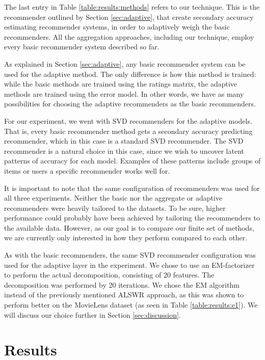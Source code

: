 The last entry in Table \ref{table:results:methods}
refers to our technique. 
This is the recommender outlined by Section \ref{sec:adaptive},
that create secondary accuracy estimating recommender systems,
in order to adaptively weigh the basic recommenders.
All the aggregation approaches, including our technique,
employ every basic recommender system described so far.

As explained in Section \ref{sec:adaptive},
any basic recommender system can be used for the adaptive method.
The only difference is how this method is trained:
while the basic methods are trained using the ratings matrix,
the adaptive methods are trained using the error model.
In other words, we have as many possibilities for choosing
the adaptive recommenders as the basic recommenders.

For our experiment, we went with SVD recommenders
for the adaptive models.
That is, every basic recommender method gets a secondary 
accuracy predicting recommender, which in this case is a 
standard SVD recommender.
The SVD recommender is a natural choice in this case,
since we wish to uncover latent patterns of accuracy
for each model.
Examples of these patterns include groups of items
or users a specific recommender works well for.

It is important to note that the same configuration of recommenders was used for all three experiments.
Neither the basic nor the aggregate or adaptive recommenders were heavily tailored
to the datasets. To be sure, higher performance could probably have been achieved
by tailoring the recommenders to the available data. 
However, as our goal is to compare our finite set of methods, 
we are currently only interested in how they perform compared to each other.

As with the basic recommenders, the same SVD recommender configuration was used 
for the adaptive layer in the experiment.
We chose to use an EM-factorizer to perform the actual decomposition,
consisting of 20 features. The decomposition was performed by 20 iterations.
We chose the EM algorithm instead of the previously mentioned ALSWR approach,
as this was shown to perform better on the MovieLens dataset
(as seen in Table \ref{table:results:e1}).
We will discuss our choice further in Section \ref{sec:discussion}.

\section{Results}
\label{sec:results}

